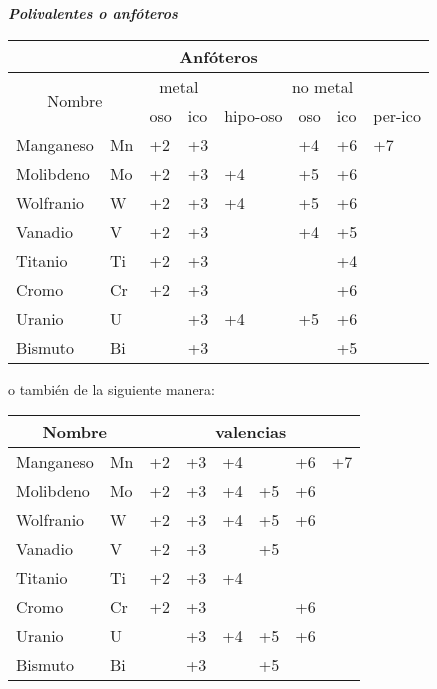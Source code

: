 \textit{\textbf{Polivalentes o anfóteros}} 
\begin{center}
\begin{tabularx}{13.2cm}{| l | l |ll|X X X X| }
	\hline
	\multicolumn{8}{|c|}{Anfóteros} \\ \hline
	\multicolumn{2}{|c|}{\multirow{2}{*}{Nombre}} & \multicolumn{2}{c|}{metal} & \multicolumn{4}{c|}{no metal} \\
	\multicolumn{2}{|c|}{} & oso & ico & hipo-oso & oso & ico & per-ico \\ \hline
	Manganeso & Mn & +2 & +3 & & +4 & +6 & +7 \\
	Molibdeno & Mo & +2 & +3 & +4 & +5 & +6 & \\
	Wolfranio & W & +2 & +3 & +4 & +5 & +6 & \\
	Vanadio & V & +2 & +3 & & +4 & +5 & \\
	Titanio & Ti & +2 & +3 & & & +4 & \\
	Cromo & Cr & +2 & +3 & & & +6 & \\
	Uranio & U & & +3 & +4 & +5 & +6 & \\
	Bismuto & Bi & & +3 & & & +5 & \\ \hline
\end{tabularx}
\end{center}
o también de la siguiente manera:
\begin{center}
	\begin{tabularx}{10cm}{|l|X|cc|cccc|}
		\hline
		\multicolumn{2}{|c|}{Nombre} & \multicolumn{6}{c|}{valencias} \\ \hline
		Manganeso & Mn & +2 & +3 & +4 & & +6 & +7 \\
		Molibdeno & Mo & +2 & +3 & +4 & +5 & +6 & \\
		Wolfranio & W & +2 & +3 & +4 & +5 & +6 & \\
		Vanadio & V & +2 & +3 & & +5 & & \\
		Titanio & Ti & +2 & +3 & +4 & & & \\
		Cromo & Cr & +2 & +3 & & & +6 & \\
		Uranio & U & & +3 & +4 & +5 & +6 & \\
		Bismuto & Bi & & +3 & & +5 & & \\ \hline
	\end{tabularx}
\end{center}

